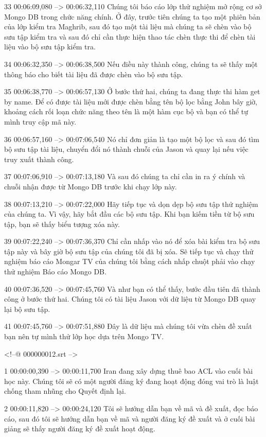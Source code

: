 33
00:06:09,080 --> 00:06:32,110
Chúng tôi báo cáo lớp thử nghiệm mở rộng cơ sở Mongo DB trong chức năng chính.  Ở đây, trước tiên chúng ta tạo một phiên bản của lớp kiểm tra Maghrib, sau đó tạo một tài liệu mà chúng ta sẽ chèn vào bộ sưu tập kiểm tra và sau đó chỉ cần thực hiện thao tác chèn thực thi để chèn tài liệu vào bộ sưu tập kiểm tra.

34
00:06:32,350 --> 00:06:38,500
Nếu điều này thành công, chúng ta sẽ thấy một thông báo cho biết tài liệu đã được chèn vào bộ sưu tập.

35
00:06:38,770 --> 00:06:57,130
Ở bước thứ hai, chúng ta đang thực thi hàm get by name.  Để có được tài liệu mới được chèn bằng tên bộ lọc bằng John bây giờ, khoảng cách rối loạn chức năng theo tên là một hàm cục bộ và bạn có thể tự mình truy cập mã này.

36
00:06:57,160 --> 00:07:06,540
Nó chỉ đơn giản là tạo một bộ lọc và sau đó tìm bộ sưu tập tài liệu, chuyển đổi nó thành chuỗi của Jason và quay lại nếu việc truy xuất thành công.

37
00:07:06,910 --> 00:07:13,180
Và sau đó chúng ta chỉ cần in ra ý chính và chuỗi nhận được từ Mongo DB trước khi chạy lớp này.

38
00:07:13,210 --> 00:07:22,000
Hãy tiếp tục và dọn dẹp bộ sưu tập thử nghiệm của chúng ta.  Vì vậy, hãy bắt đầu các bộ sưu tập.  Khi bạn kiếm tiền từ bộ sưu tập, bạn sẽ thấy biểu tượng xóa này.

39
00:07:22,240 --> 00:07:36,370
Chỉ cần nhấp vào nó để xóa bài kiểm tra bộ sưu tập này và bây giờ bộ sưu tập của chúng tôi đã bị xóa.  Sẽ tiếp tục và chạy thử nghiệm báo cáo Mongar TV của chúng tôi bằng cách nhấp chuột phải vào chạy thử nghiệm Báo cáo Mongo DB.

40
00:07:36,520 --> 00:07:45,760
Và như bạn có thể thấy, bước đầu tiên đã thành công ở bước thứ hai.  Chúng tôi có tài liệu Jason với dữ liệu từ Mongo DB quay lại bộ sưu tập.

41
00:07:45,760 --> 00:07:51,880
Đây là dữ liệu mà chúng tôi vừa chèn đề xuất bạn nên tự mình thử lớp học dựa trên Mongo TV.

<!--@ 000000012.srt -->

1
00:00:00,390 --> 00:00:11,700
Iran đang xây dựng thuê bao ACL vào cuối bài học này.  Chúng tôi sẽ có một người đăng ký đang hoạt động đóng vai trò là luật chống tham nhũng cho Quyết định lại.

2
00:00:11,820 --> 00:00:24,120
Tôi sẽ hướng dẫn bạn về mã và đề xuất, đọc báo cáo, sau đó tôi sẽ hướng dẫn bạn về mã và người đăng ký đề xuất và ở cuối bài giảng sẽ thấy người đăng ký đề xuất hoạt động.

